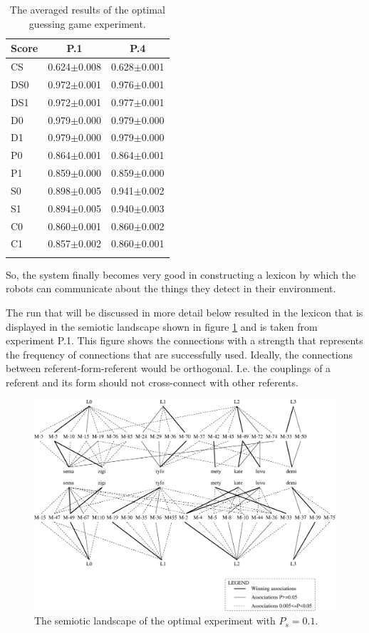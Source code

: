 \begin{table}
\centering
\begin{tabular}{lcc}
\lsptoprule
Score & P.1 & P.4 \\\midrule
CS & 0.624$\pm$0.008& 0.628$\pm$0.001\\%
DS0 & 0.972$\pm$0.001 & 0.976$\pm$0.001\\%
DS1 & 0.972$\pm$0.001 & 0.977$\pm$0.001\\%
D0 & 0.979$\pm$0.000 & 0.979$\pm$0.000\\%
D1 & 0.979$\pm$0.000 & 0.979$\pm$0.000\\%
P0 & 0.864$\pm$0.001 & 0.864$\pm$0.001\\%
P1& 0.859$\pm$0.000 & 0.859$\pm$0.000\\%
S0 & 0.898$\pm$0.005 & 0.941$\pm$0.002\\%
S1 & 0.894$\pm$0.005 & 0.940$\pm$0.003\\%
C0 & 0.860$\pm$0.001 & 0.860$\pm$0.002\\%
C1 & 0.857$\pm$0.002 & 0.860$\pm$0.001\\%
\lspbottomrule
\end{tabular}
\caption{The averaged results of the optimal guessing game experiment.}
\label{t:opt:ggavg}
\end{table}

So, the system finally becomes very good in constructing a lexicon by which the robots can communicate about the things they detect in their environment.

The run that will be discussed in more detail below resulted in the lexicon that is displayed in the semiotic landscape shown in figure \ref{f:opt:semiotic} and is taken from experiment P.1. This figure shows the connections with a strength that represents the frequency of connections that are successfully used. Ideally, the connections between referent-form-referent would be orthogonal. I.e. the couplings of a referent and its form should not cross-connect with other referents.

\begin{figure}[t]
\centerline{\includegraphics[width=12cm]{optimal/semiotic.eps}}
\caption{The semiotic landscape of the optimal experiment with $P_s=0.1$.}
\label{f:opt:semiotic}
\end{figure}

